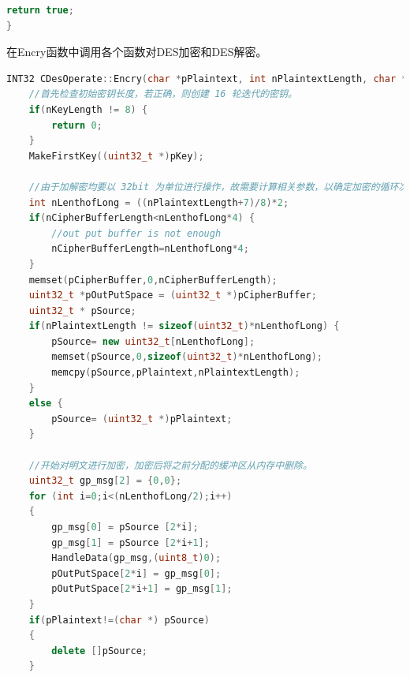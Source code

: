 \documentclass[UTF8,a4paper,10pt]{ctexart}
\begin{document}
\begin{itemize}
\begin{lstlisting}[language = c++]
  return true;
}
  \end{lstlisting}
  在Encry函数中调用各个函数对DES加密和DES解密。
  \begin{lstlisting}[language = c++]
INT32 CDesOperate::Encry(char *pPlaintext, int nPlaintextLength, char *pCipherBuffer, int &nCipherBufferLength, char *pKey, int nKeyLength) {
    //首先检查初始密钥长度，若正确，则创建 16 轮迭代的密钥。
    if(nKeyLength != 8) {
        return 0;
    }
    MakeFirstKey((uint32_t *)pKey);

    //由于加解密均要以 32bit 为单位进行操作，故需要计算相关参数，以确定加密的循环次数以及密文缓冲区是否够用，确定后将需要加密的明文格式化到新分配的缓冲区内。
    int nLenthofLong = ((nPlaintextLength+7)/8)*2;
    if(nCipherBufferLength<nLenthofLong*4) {
        //out put buffer is not enough
        nCipherBufferLength=nLenthofLong*4;
    }
    memset(pCipherBuffer,0,nCipherBufferLength);
    uint32_t *pOutPutSpace = (uint32_t *)pCipherBuffer;
    uint32_t * pSource;
    if(nPlaintextLength != sizeof(uint32_t)*nLenthofLong) {
        pSource= new uint32_t[nLenthofLong];
        memset(pSource,0,sizeof(uint32_t)*nLenthofLong);
        memcpy(pSource,pPlaintext,nPlaintextLength);
    }
    else {
        pSource= (uint32_t *)pPlaintext;
    }

    //开始对明文进行加密，加密后将之前分配的缓冲区从内存中删除。
    uint32_t gp_msg[2] = {0,0};
    for (int i=0;i<(nLenthofLong/2);i++)
    {
        gp_msg[0] = pSource [2*i];
        gp_msg[1] = pSource [2*i+1];
        HandleData(gp_msg,(uint8_t)0);
        pOutPutSpace[2*i] = gp_msg[0];
        pOutPutSpace[2*i+1] = gp_msg[1];
    }
    if(pPlaintext!=(char *) pSource)
    {
        delete []pSource;
    }
    

\end{lstlisting}
\end{itemize}
\end{document}

